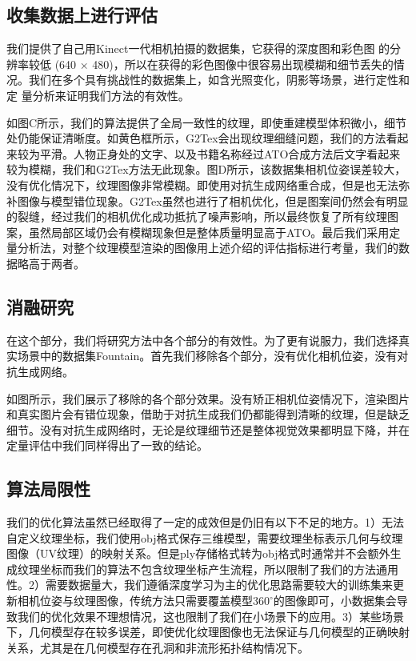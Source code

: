 \subsection{收集数据上进行评估}

我们提供了自己用Kinect一代相机拍摄的数据集，它获得的深度图和彩色图 的分辨率较低 (640 × 480)，所以在获得的彩色图像中很容易出现模糊和细节丢失的情况。我们在多个具有挑战性的数据集上，如含光照变化，阴影等场景，进行定性和定 量分析来证明我们方法的有效性。\par
如图C所示，我们的算法提供了全局一致性的纹理，即使重建模型体积微小，细节处仍能保证清晰度。如黄色框所示，G2Tex会出现纹理细缝问题，我们的方法看起来较为平滑。人物正身处的文字、以及书籍名称经过ATO合成方法后文字看起来较为模糊，我们和G2Tex方法无此现象。图D所示，该数据集相机位姿误差较大，没有优化情况下，纹理图像非常模糊。即使用对抗生成网络重合成，但是也无法弥补图像与模型错位现象。G2Tex虽然也进行了相机优化，但是图案间仍然会有明显的裂缝，经过我们的相机优化成功抵抗了噪声影响，所以最终恢复了所有纹理图案，虽然局部区域仍会有模糊现象但是整体质量明显高于ATO。最后我们采用定量分析法，对整个纹理模型渲染的图像用上述介绍的评估指标进行考量，我们的数据略高于两者。


%
\subsection{消融研究}
在这个部分，我们将研究方法中各个部分的有效性。为了更有说服力，我们选择真实场景中的数据集Fountain。首先我们移除各个部分，没有优化相机位姿，没有对抗生成网络。\par
如图所示，我们展示了移除的各个部分效果。没有矫正相机位姿情况下，渲染图片和真实图片会有错位现象，借助于对抗生成我们仍都能得到清晰的纹理，但是缺乏细节。没有对抗生成网络时，无论是纹理细节还是整体视觉效果都明显下降，并在定量评估中我们同样得出了一致的结论。\par


\subsection{算法局限性}
我们的优化算法虽然已经取得了一定的成效但是仍旧有以下不足的地方。1）无法自定义纹理坐标，我们使用obj格式保存三维模型，需要纹理坐标表示几何与纹理图像（UV纹理）的映射关系。但是ply存储格式转为obj格式时通常并不会额外生成纹理坐标而我们的算法不包含纹理坐标产生流程，所以限制了我们的方法通用性。2）需要数据量大，我们遵循深度学习为主的优化思路需要较大的训练集来更新相机位姿与纹理图像，传统方法只需要覆盖模型$360^{\circ} $的图像即可，小数据集会导致我们的优化效果不理想情况，这也限制了我们在小场景下的应用。3）某些场景下，几何模型存在较多误差，即使优化纹理图像也无法保证与几何模型的正确映射关系，尤其是在几何模型存在孔洞和非流形拓扑结构情况下。




